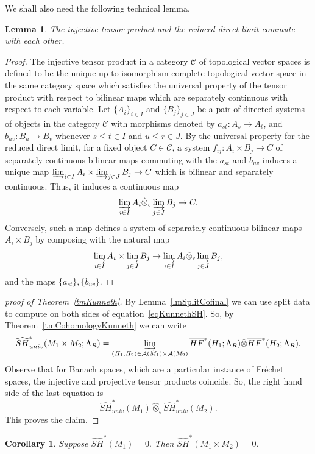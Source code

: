 \documentclass[11pt]{amsart}
\newtheorem{lm}[tm]{Lemma}
\newtheorem{cy}[tm]{Corollary}
\theoremstyle{definition}
\theoremstyle{remark}
\begin{document}
We shall also need the following technical lemma.
\begin{lm}
The injective tensor product and the reduced direct limit  commute with each other.
\end{lm}
\begin{proof}
The injective tensor product in a category $\mathcal{C}$ of topological vector spaces  is defined to be the unique up to isomorphism complete topological vector space in the same category space which satisfies the universal property of the tensor product with respect to bilinear maps which are separately continuous with respect to each variable. Let $\{A_i\}_{i\in I}$ and $\{B_j\}_{j\in J}$ be a pair of directed systems of objects in the category $\mathcal{C}$ with morphisms denoted by $a_{st}:A_s\to A_t$, and $b_{uv}:B_u\to B_v$ whenever $s\leq t\in I$ and $u\leq r\in J$. By the universal property for the reduced direct limit, for a fixed object $C\in\mathcal{C}$, a system $f_{ij}:A_i\times B_j\to C$ of separately continuous bilinear maps commuting with the $a_{st}$ and $b_{uv}$ induces a unique map $\varinjlim_{i\in I}A_i\times\varinjlim_{j\in J}B_j\to C$ which is bilinear and separately continuous. Thus, it induces a  continuous map
 \[
 \varinjlim_{i\in I}A_i\hat{\otimes}_\epsilon\varinjlim_{j\in J}B_j\to C.
 \]
 Conversely, such a map defines a system of separately continuous bilinear maps $A_i\times B_j$ by composing with the natural map
 \[
  \varinjlim_{i\in I}A_i\times\varinjlim_{j\in J}B_j\to \varinjlim_{i\in I}A_i\hat{\otimes}_\epsilon\varinjlim_{j\in J}B_j,
 \]
 and the maps $\{a_{st}\},\{b_{uv}\}$.
\end{proof}


\begin{proof}[proof of Theorem~\ref{tmKunneth}]
By Lemma~\ref{lmSplitCofinal} we can use split data to compute on both sides of equation~\eqref{eqKunnethSH}. So, by Theorem~\ref{tmCohomologyKunneth} we can write
\[
\widehat{SH}_{univ}^*(M_1\times M_2;\Lambda_R)=\varinjlim_{(H_1,H_2)\in \mathcal{A}(M_1)\times\mathcal{A}(M_2)}\overline{HF}^*(H_1;\Lambda_R)\hat\otimes\overline{HF}^*(H_2;\Lambda_R).
\]
Observe that for Banach spaces, which are a particular instance of Fr\'echet spaces, the injective and projective tensor products coincide. So, the right hand side of the last equation is
\[
\widehat{SH}_{univ}^*(M_1)\hat{\otimes}_\epsilon\widehat{SH}_{univ}^*(M_2).
\]
This proves the claim.
\end{proof}
\begin{cy}
Suppose $\widehat{SH}^*(M_1)=0.$ Then $\widehat{SH}^*(M_1\times M_2)=0$.
\end{cy}
\end{document}

